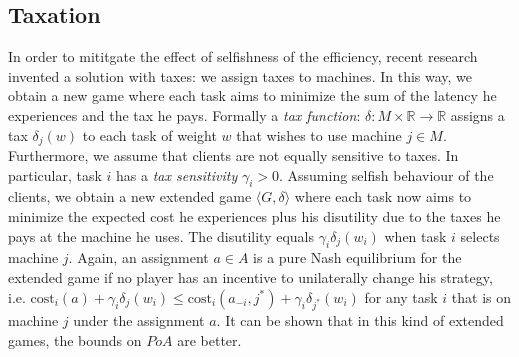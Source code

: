 \documentclass[a4paper,11pt]{article}
\newcommand{\R}{{\mathbb R}}
\newcommand{\cost}{\text{cost}}
\begin{document}
\subsection{Taxation}\cite{9}
In order to mititgate the effect of selfishness of the efficiency, recent research invented a solution with taxes: we assign taxes to machines. In this way, we obtain a new game where each task aims to minimize the sum of the latency he experiences and the tax he pays. Formally a \emph{tax function}: $\delta: M \times \R \rightarrow \R$ assigns a tax $\delta_j(w)$ to each task of weight $w$ that wishes to use machine $j \in M$. Furthermore, we assume that clients are not equally sensitive to taxes. In particular, task $i$ has a \emph{tax sensitivity} $\gamma_i > 0$. Assuming selfish behaviour of the clients, we obtain a new extended game $\langle G, \delta \rangle$ where each task now aims to minimize the expected cost he experiences plus his disutility due to the taxes he pays at the machine he uses. The disutility equals $\gamma_i \delta_j(w_i)$ when task $i$ selects machine $j$. Again, an assignment $a \in A$ is a pure Nash equilibrium for the extended game if no player has an incentive to unilaterally change his strategy, i.e. $\cost_i(a) + \gamma_i \delta_j(w_i) \leq \cost_i(a_{-i}, j^*) + \gamma_i \delta_{j^*}(w_i)$ for any task $i$ that is on machine $j$ under the assignment $a$. It can be shown that in this kind of extended games, the bounds on $PoA$ are better.
\newpage
\end{document}
